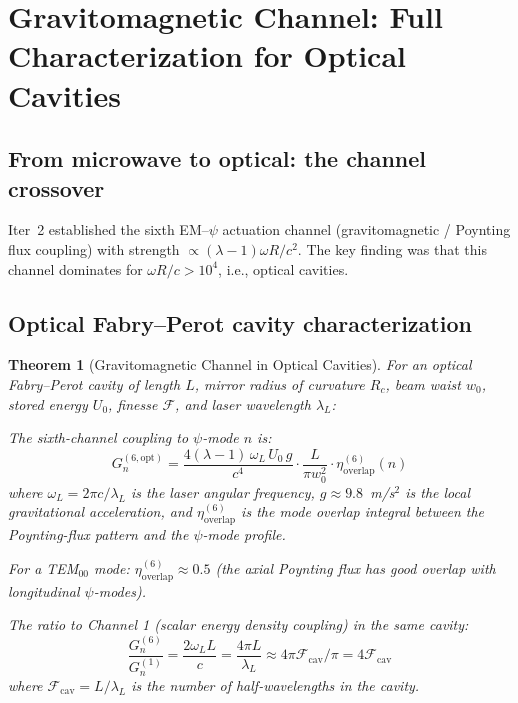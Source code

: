 \documentclass[11pt]{article}
\newtheorem{theorem}{Theorem}[section]
\theoremstyle{definition}
\theoremstyle{remark}
\newcommand{\lam}{\lambda}
\begin{document}
\section{Gravitomagnetic Channel: Full Characterization for Optical Cavities}
\label{sec:gravitomagnetic-optical}

\subsection{From microwave to optical: the channel crossover}

Iter~2 established the sixth EM--$\psi$ actuation channel (gravitomagnetic
/ Poynting flux coupling) with strength $\propto(\lam-1)\omega R/c^2$.
The key finding was that this channel dominates for
$\omega R/c > 10^4$, i.e., optical cavities.

\subsection{Optical Fabry--Perot cavity characterization}

\begin{theorem}[Gravitomagnetic Channel in Optical Cavities]
\label{thm:optical-grav}
For an optical Fabry--Perot cavity of length $L$, mirror radius of
curvature $R_c$, beam waist $w_0$, stored energy $U_0$, finesse
$\mathcal{F}$, and laser wavelength $\lambda_L$:

The sixth-channel coupling to $\psi$-mode $n$ is:
\begin{equation}
\boxed{
G_n^{(6,\mathrm{opt})} = \frac{4(\lam-1)\,\omega_L\,U_0\,g}{c^4}
\cdot\frac{L}{\pi w_0^2}
\cdot\eta_{\mathrm{overlap}}^{(6)}(n)
}
\label{eq:optical-sixth}
\end{equation}
where $\omega_L = 2\pi c/\lambda_L$ is the laser angular frequency,
$g \approx 9.8$~m/s$^2$ is the local gravitational acceleration, and
$\eta_{\mathrm{overlap}}^{(6)}$ is the mode overlap integral between
the Poynting-flux pattern and the $\psi$-mode profile.

For a TEM$_{00}$ mode: $\eta_{\mathrm{overlap}}^{(6)} \approx 0.5$
(the axial Poynting flux has good overlap with longitudinal $\psi$-modes).

The ratio to Channel 1 (scalar energy density coupling) in the same cavity:
\begin{equation}
\boxed{
\frac{G_n^{(6)}}{G_n^{(1)}} = \frac{2\omega_L L}{c}
= \frac{4\pi L}{\lambda_L}
\approx 4\pi\mathcal{F}_{\mathrm{cav}}/\pi = 4\mathcal{F}_{\mathrm{cav}}
}
\label{eq:sixth-to-first}
\end{equation}
where $\mathcal{F}_{\mathrm{cav}} = L/\lambda_L$ is the number of
half-wavelengths in the cavity.
\end{theorem}
\end{document}
